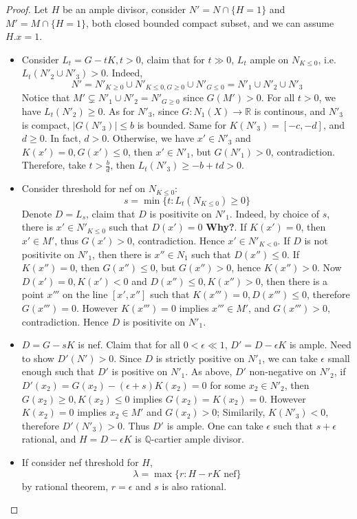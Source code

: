 \documentclass{article}
\begin{document}
\begin{proof}
	Let $ H $ be an ample divisor, consider $ N'=N\cap \{H=1\} $ and $ M'=M\cap \{H=1\} $, both closed bounded compact subset, and we can assume $ H.x=1 $. 
	\begin{itemize}
		\item Consider $ L_t=G-tK, t>0 $, claim that for $ t\gg 0 $, $ L_t $ ample on $ N_{K\leqslant 0} $, i.e. $ L_t(N'_2 \cup N'_3)>0 $. Indeed, 
		$$ N'=N'_{K\geqslant 0}\cup N'_{K\leqslant 0,G\geqslant 0}\cup N'_{G\leqslant 0}=N'_1\cup N'_2 \cup N'_3 $$
		Notice that $ M'\subsetneq N'_1\cup N'_2=N'_{G\geqslant 0} $ since $ G(M')>0 $. For all $ t>0 $, we have $ L_t(N'_2)\geqslant0 $. As for $ N'_3 $, since $ G:N_1(X)\to \mathbb{R} $ is continous, and $ N'_3 $ is compact, $ |G(N'_3)|\leqslant b $ is bounded. Same for $ K(N'_3)=[-c,-d] $, and $ d\geqslant 0 $. In fact, $ d>0 $. Otherwise, we have $ x'\in N'_3 $ and $ K(x')=0, G(x')\leqslant 0 $, then $ x'\in N'_1 $, but $ G(N'_1)>0 $, contradiction. Therefore, take $ t> \frac{b}{d} $, then $ L_t(N'_3)\geqslant -b+td>0 $.
		\item 	Consider threshold for nef on $ N_{K\leqslant 0} $:
		$$ s=\min \{t: L_t(N_{K\leqslant 0})\geqslant0  \} $$
		Denote $ D=L_s $, claim that $ D $ is positivite on $ N'_1 $. Indeed, by choice of $ s $, there is $ x'\in N'_{K\leqslant 0} $ such that $ D(x')=0 $ \textbf{Why?}. If $ K(x')=0 $, then $ x'\in M' $, thus $ G(x')>0 $, contradiction. Hence $ x'\in N'_{K<0} $. If $ D $ is not positivite on $ N'_1 $, then there is $ x''\in N_1 $ such that $ D(x'')\leqslant 0 $. If $ K(x'')=0 $, then $ G(x'')\leqslant 0 $, but $ G(x'')>0 $, hence $ K(x'')>0 $. Now $ D(x')=0,K(x')<0 $ and $ D(x'')\leqslant 0,K(x'')>0 $, then there is  a point $ x''' $ on the line $ [x',x''] $ such that  $ K(x''')=0,D(x''')\leqslant 0 $,  therefore $ G(x''')=0 $. However $ K(x''')=0 $ implies $ x'''\in M' $, and $ G(x''')>0 $, contradiction. Hence $ D $ is positivite on $ N'_1 $.
		\item $ D=G-sK $ is nef. Claim that for all $ 0<\epsilon \ll 1 $, $ D'=D-\epsilon K $ is ample. Need to show $ D'(N')>0 $. Since $ D $ is strictly positive on $ N'_1 $, we can take $ \epsilon $ small enough such that $ D' $ is positive on $ N'_1 $. As above, $ D' $ non-negative on $ N'_2 $, if $ D'(x_2)=G(x_2)-(\epsilon +s)K(x_2)=0$ for some $ x_2\in N'_2 $, then $ G(x_2)\geqslant 0,K(x_2)\leqslant 0 $ implies $ G(x_2)=K(x_2)=0 $. However $ K(x_2)=0 $ implies $ x_2\in M' $ and $ G(x_2)>0 $;  Similarily, $ K(N'_3)<0 $, therefore $ D'(N'_3)>0 $. Thus $ D' $ is ample. One can take $ \epsilon $ such that $ s+\epsilon $ rational, and $ H=D-\epsilon K $ is $ \mathbb{Q} $-cartier ample divisor.
		\item If consider nef threshold for $ H $,
		$$ \lambda=\max\{r: H-rK \text{ nef}\} $$
		by rational theorem, $ r=\epsilon $ and $ s $ is also rational.
	\end{itemize}

	

\end{proof}
\end{document}
